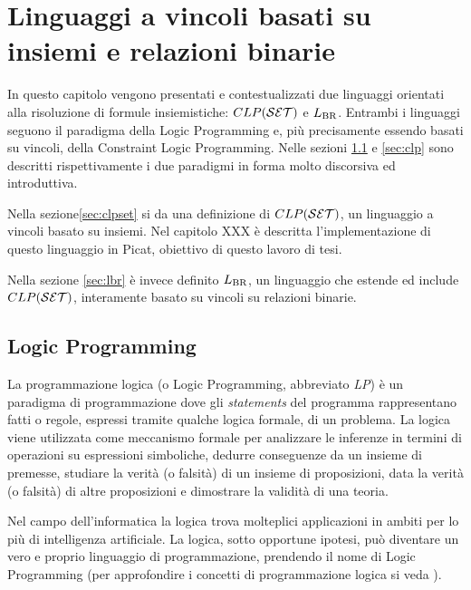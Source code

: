 


\chapter{Linguaggi a vincoli basati su insiemi e relazioni binarie}
\label{ch:sets-binrel-based-constraint-languages}

\minitoc

In questo capitolo vengono presentati e contestualizzati due linguaggi orientati alla risoluzione di formule insiemistiche: $CLP(\mathcal{S}\mathcal{E}\mathcal{T})$ e $L_\mathrm{BR}$. Entrambi i linguaggi seguono il paradigma della Logic Programming e, più precisamente essendo basati su vincoli, della Constraint Logic Programming. Nelle sezioni \ref{sec:lp} e \ref{sec:clp} sono descritti rispettivamente i due paradigmi in forma molto discorsiva ed introduttiva.

Nella sezione\ref{sec:clpset} si da una definizione di $CLP(\mathcal{S}\mathcal{E}\mathcal{T})$, un linguaggio a vincoli basato su insiemi. 
Nel capitolo XXX è descritta l'implementazione di questo linguaggio in Picat, obiettivo di questo lavoro di tesi.

Nella sezione \ref{sec:lbr} è invece definito $L_\mathrm{BR}$, un linguaggio che estende ed include $CLP(\mathcal{S}\mathcal{E}\mathcal{T})$, interamente basato su vincoli su relazioni binarie.


\section{Logic Programming}
\label{sec:lp}

La programmazione logica (o Logic Programming, abbreviato \emph{LP}) è un paradigma di programmazione dove gli \emph{statements} del programma rappresentano fatti o regole, espressi tramite qualche logica formale, di un problema. La logica viene utilizzata come meccanismo formale per analizzare le inferenze in termini di operazioni su espressioni simboliche, dedurre conseguenze da un insieme di premesse, studiare la verità (o falsità) di un insieme di proposizioni, data la verità (o falsità) di altre proposizioni e dimostrare la validità di una teoria.

Nel campo dell'informatica la logica trova molteplici applicazioni in ambiti per lo più di intelligenza artificiale. La logica, sotto opportune ipotesi, può diventare un vero e proprio linguaggio di programmazione, prendendo il nome di Logic Programming (per approfondire i concetti di programmazione logica si veda \cite{ConsoleL97}).

